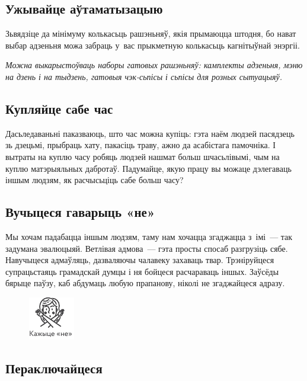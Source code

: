 
\subsection*{Ужывайце аўтаматызацыю}

Зьвядзіце да мінімуму колькасьць рашэньняў, якія прымаюцца штодня, бо нават выбар адзеньня можа забраць у~вас прыкметную колькасьць кагнітыўнай энэргіі. 

\emph{Можна выкарыстоўваць наборы гатовых рашэньняў: камплекты адзеньня, мэню на дзень і на тыдзень, гатовыя чэк-сьпісы і сьпісы для розных сытуацыяў.}

\subsection*{Купляйце сабе час}

Дасьледаваньні паказваюць, што час можна купіць: гэта наём людзей пасядзець зь дзецьмі, прыбраць хату, пакасіць траву, ажно да асабістага памочніка. І вытраты на куплю часу робяць людзей нашмат больш шчасьлівымі, чым на куплю матэрыяльных дабротаў. Падумайце, якую працу вы можаце дэлегаваць іншым людзям, як расчысьціць сабе больш часу?

\subsection*{Вучыцеся гаварыць «не»}

Мы хочам падабацца іншым людзям, таму нам хочацца згаджацца з~імі~--- так задумана эвалюцыяй. Ветлівая адмова~--- гэта просты спосаб разгрузіць сябе. Навучыцеся адмаўляць, дазваляючы чалавеку захаваць твар. Трэніруйцеся супрацьстаяць грамадскай думцы і ня бойцеся расчараваць іншых. Заўсёды бярыце паўзу, каб абдумаць любую прапанову, ніколі не згаджайцеся адразу.

\begin{figure}[htb!]
  \centering
  \includegraphics[scale=1.5]{willpower/ch7/8.pdf}
\end{figure}

\subsection*{Пераключайцеся}

